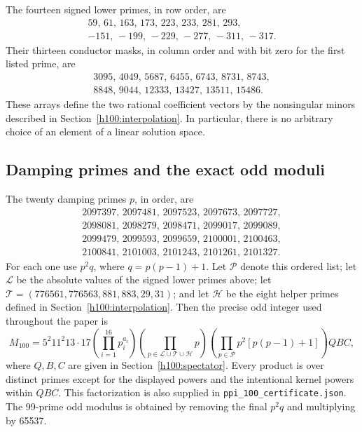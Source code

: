 \documentclass[11pt]{article}
\numberwithin{equation}{section}
\theoremstyle{definition}
\theoremstyle{remark}
\begin{document}
The fourteen signed lower primes, in row order, are
\[
\begin{gathered}
59,\,61,\,163,\,173,\,223,\,233,\,281,\,293,\\
-151,\,-199,\,-229,\,-277,\,-311,\,-317.
\end{gathered}
\]
Their thirteen conductor masks, in column order and with bit zero for the
first listed prime, are
\[
\begin{gathered}
3095,\,4049,\,5687,\,6455,\,6743,\,8731,\,8743,\\
8848,\,9044,\,12333,\,13427,\,13511,\,15486.
\end{gathered}
\]
These arrays define the two rational coefficient vectors by the nonsingular
minors described in Section~\ref{h100:interpolation}. In particular, there is
no arbitrary choice of an element of a linear solution space.

\subsection{Damping primes and the exact odd moduli}
The twenty damping primes $p$, in order, are
\[
\begin{gathered}
2097397,\,2097481,\,2097523,\,2097673,\,2097727,\\
2098081,\,2098279,\,2098471,\,2099017,\,2099089,\\
2099479,\,2099593,\,2099659,\,2100001,\,2100463,\\
2100841,\,2101003,\,2101243,\,2101261,\,2101327.
\end{gathered}
\]
For each one use $p^2q$, where $q=p(p-1)+1$.
Let $\mathcal P$ denote this ordered list; let $\mathcal L$ be the absolute
values of the signed lower primes above; let
$\mathcal T=(776561,776563,881,883,29,31)$; and let $\mathcal H$
be the eight helper primes defined in Section~\ref{h100:interpolation}.
Then the precise odd integer used throughout the paper is
\begin{equation}\label{v2:eq:M100}
 M_{100}=5^2 11^2 13\cdot17
 \left(\prod_{i=1}^{16}p_i^{a_i}\right)
 \left(\prod_{p\in\mathcal L\cup\mathcal T\cup\mathcal H}p\right)
 \left(\prod_{p\in\mathcal P}p^2[p(p-1)+1]\right)QBC,
\end{equation}
where $Q,B,C$ are given in Section~\ref{h100:spectator}. Every product is
over distinct primes except for the displayed powers and the intentional
kernel powers within $QBC$. This factorization is also supplied in
\texttt{ppi\_100\_certificate.json}. The 99-prime odd modulus is obtained by
removing the final $p^2q$ and multiplying by 65537.
\end{document}
